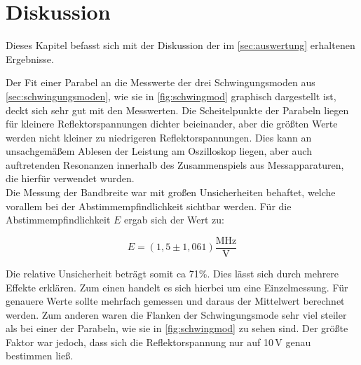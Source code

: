 

\section{Diskussion}
\label{sec:Diskussion}

Dieses Kapitel befasst sich mit der Diskussion der im \autoref{sec:auswertung} erhaltenen Ergebnisse.



Der Fit einer Parabel an die Messwerte der drei Schwingungsmoden aus \autoref{sec:schwingungsmoden}, wie sie in \autoref{fig:schwingmod} graphisch dargestellt ist, deckt sich sehr gut mit den Messwerten.
Die Scheitelpunkte der Parabeln liegen für kleinere Reflektorspannungen dichter beieinander, aber die größten Werte werden nicht kleiner zu niedrigeren Reflektorspannungen.
Dies kann an unsachgemäßem Ablesen der Leistung am Oszilloskop liegen, aber auch auftretenden Resonanzen innerhalb des Zusammenspiels aus Messapparaturen, die hierfür verwendet wurden.\\
Die Messung der Bandbreite war mit großen Unsicherheiten behaftet, welche vorallem bei der Abstimmempfindlichkeit sichtbar werden.
Für die Abstimmempfindlichkeit $E$ ergab sich der Wert zu:

\begin{equation}
E = (1,5 \pm 1,061) \frac{\text{MHz}}{\text{V}}
\label{eq:elbandbreite2}
\end{equation}

Die relative Unsicherheit beträgt somit ca 71\%. Dies lässt sich durch mehrere Effekte erklären. Zum einen handelt es sich hierbei um eine Einzelmessung.
Für genauere Werte sollte mehrfach gemessen und daraus der Mittelwert berechnet werden.
Zum anderen waren die Flanken der Schwingungsmode sehr viel steiler als bei einer der Parabeln, wie sie in \autoref{fig:schwingmod} zu sehen sind.
Der größte Faktor war jedoch, dass sich die Reflektorspannung nur auf 10\,V genau bestimmen ließ.\\

